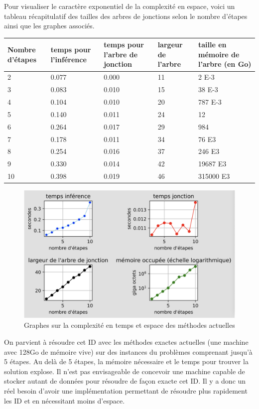 \documentclass[12pt]{article}
\begin{document}
\pagebreak
Pour visualiser le caractère exponentiel de la complexité en espace, voici un tableau récapitulatif des tailles des arbres de jonctions selon le nombre d'étapes ainsi que les graphes associés.
\bigbreak
\bigbreak
   \begin{tabular}{|p{3cm} || p{3cm} | p{3cm} | p{3cm} | p{3cm} | }
    \hline
    Nombre d'étapes & temps pour l'inférence & temps pour l'arbre de jonction & largeur de l'arbre & taille en mémoire de l'arbre (en Go) \\ 
    \hline
    2&0.077&0.000&11&2 E-3\\
    \hline
    3&0.083&0.010&15&38 E-3\\
    \hline
    4&0.104&0.010&20&787 E-3\\
    \hline
    5&0.140&0.011&24&12\\
    \hline
    6&0.264&0.017&29&984\\
    \hline
    7&0.178&0.011&34&76 E3\\
    \hline
    8&0.254&0.016&37&246 E3\\
    \hline
    9&0.330&0.014&42&19687 E3\\
    \hline
    10&0.398&0.019&46&315000 E3\\
    \hline
   \end{tabular}
 \begin{figure}[h]
\centering
\includegraphics[scale=0.32]{docs/graphes.png}
\caption{Graphes sur la complexité en temps et espace des méthodes actuelles}
\end{figure}
\bigbreak
\bigbreak
On parvient à résoudre cet ID avec les méthodes exactes actuelles (une machine avec 128Go de mémoire vive) sur des instances du problèmes comprenant jusqu'à 5 étapes. Au delà de 5 étapes, la mémoire nécessaire et le temps pour trouver la solution explose. Il n'est pas envisageable de concevoir une machine capable de stocker autant de données pour résoudre de façon exacte cet ID. Il y a donc un réel besoin d'avoir une implémentation permettant de résoudre plus rapidement les ID et en nécessitant moins d'espace.
\end{document}
